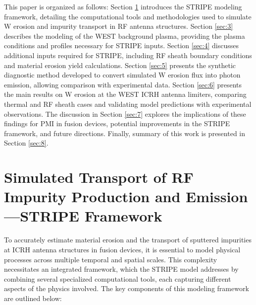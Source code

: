 \documentclass[10pt]{iopart}
\begin{document}
This paper is organized as follows: Section \ref{sec:2} introduces the STRIPE modeling framework, detailing the computational tools and methodologies used to simulate W erosion and impurity transport in RF antenna structures. Section \ref{sec:3} describes the modeling of the WEST background plasma, providing the plasma conditions and profiles necessary for STRIPE inputs. Section \ref{sec:4} discusses additional inputs required for STRIPE, including RF sheath boundary conditions and material erosion yield calculations. Section \ref{sec:5} presents the synthetic diagnostic method developed to convert simulated W erosion flux into photon emission, allowing comparison with experimental data. Section \ref{sec:6} presents the main results on W erosion at the WEST ICRH antenna limiters, comparing thermal and RF sheath cases and validating model predictions with experimental observations. The discussion in Section \ref{sec:7} explores the implications of these findings for PMI in fusion devices, potential improvements in the STRIPE framework, and future directions. Finally, summary of this work is presented in Section \ref{sec:8}.


\section{Simulated Transport of RF Impurity Production and Emission—STRIPE Framework} 
\label{sec:2}

To accurately estimate material erosion and the transport of sputtered impurities at ICRH antenna structures in fusion devices, it is essential to model physical processes across multiple temporal and spatial scales. This complexity necessitates an integrated framework, which the STRIPE model addresses by combining several specialized computational tools, each capturing different aspects of the physics involved. The key components of this modeling framework are outlined below:
\end{document}
